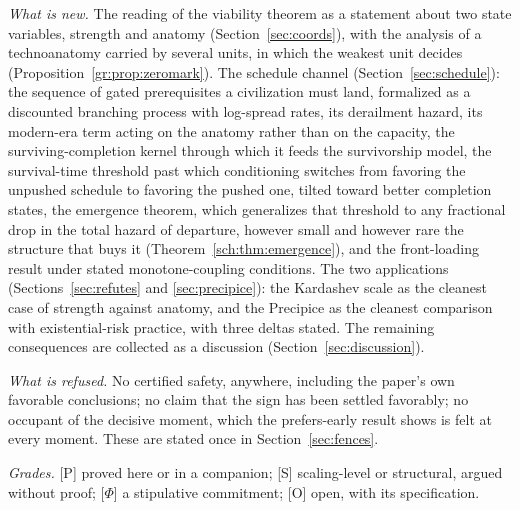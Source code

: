 \emph{What is new.} The reading of the viability theorem as a statement
about two state variables, strength and anatomy
(Section~\ref{sec:coords}), with the analysis of a technoanatomy carried by several units, in which the weakest unit decides (Proposition~\ref{gr:prop:zeromark}). The schedule channel
(Section~\ref{sec:schedule}): the sequence of gated prerequisites a
civilization must land, formalized as a discounted branching process
with log-spread rates, its derailment hazard, its modern-era term acting
on the anatomy rather than on the capacity, the surviving-completion
kernel through which it feeds the survivorship model, the survival-time
threshold past which conditioning switches from favoring the unpushed
schedule to favoring the pushed one, tilted toward better completion states, the emergence theorem, which generalizes that threshold to any fractional drop in the total hazard of departure, however small and however rare the structure that buys it (Theorem~\ref{sch:thm:emergence}), and the front-loading
result under stated monotone-coupling conditions. The two applications
(Sections~\ref{sec:refutes} and \ref{sec:precipice}): the Kardashev
scale as the cleanest case of strength against anatomy, and the
Precipice as the cleanest comparison with existential-risk practice,
with three deltas stated. The remaining consequences are collected as a
discussion (Section~\ref{sec:discussion}).

\emph{What is refused.} No certified safety, anywhere, including the
paper's own favorable conclusions; no claim that the sign has been
settled favorably; no occupant of the decisive moment, which the
prefers-early result shows is felt at every moment. These are stated once
in Section~\ref{sec:fences}.

\emph{Grades.} [P] proved here or in a companion; [S] scaling-level or
structural, argued without proof; [$\Phi$] a stipulative commitment; [O]
open, with its specification.

